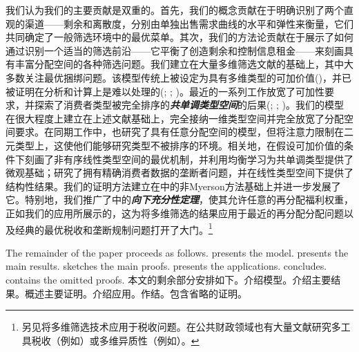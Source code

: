 \documentclass[12pt,letterpaper]{article}
\newenvironment{original}{\color{black}\noindent}{}
\newenvironment{translation}{\color{blue}\noindent}{}
\theoremstyle{plain}
\theoremstyle{definition}
\theoremstyle{remark}
\renewcommand{\1}{\mathds{1}}
\theoremstyle{definition}
\begin{document}
\begin{translation}
我们认为我们的主要贡献是双重的。首先，我们的概念贡献在于明确识别了两个直观的渠道——剩余和离散度，分别由单独出售需求曲线的水平和弹性来衡量，它们共同确定了一般筛选环境中的最优菜单。其次，我们的方法论贡献在于展示了如何通过识别一个适当的筛选前沿——它平衡了创造剩余和控制信息租金——来刻画具有丰富分配空间的各种筛选问题。我们建立在大量多维筛选文献的基础上，其中大多数关注最优捆绑问题。该模型传统上被设定为具有多维类型的可加价值(\citealt*{McAfee1989MultiproductValues,Rochet1998, mcafee1988multidimensional, manelli2006bundling, daskalakis2017strong})，并已被证明在分析和计算上是难以处理的(\citealt{Rochet2003}; \citealt{daskalakis2014complexity}; \citealt{lahr2024extreme})。最近的一系列工作放宽了可加性要求，并探索了消费者类型被完全排序的\textit{\textbf{共单调类型空间}}的后果(\citealt{haghpanah2021pure}; \citealt{ghili2021characterization}; \citealt{yang2023nested})。我们的模型在很大程度上建立在上述文献基础上，完全接纳一维类型空间并完全放宽了分配空间要求。在同期工作中，\citet{haghpanah2025screening}也研究了具有任意分配空间的模型，但将注意力限制在二元类型上，这使他们能够研究类型不被排序的环境。相关地，\cite{pernoud2025bundling}在假设可加价值的条件下刻画了非有序线性类型空间的最优机制，并利用均衡学习为共单调类型提供了微观基础；\cite*{frick2024multidimensional}研究了拥有精确消费者数据的垄断者问题，并在线性类型空间下提供了结构性结果。我们的证明方法建立在\citet{yang2022costly}中的非Myerson方法基础上并进一步发展了它。特别地，我们推广了\citet{yang2022costly}中的\textit{\textbf{向下充分性定理}}，使其允许任意的再分配福利权重，正如我们的应用所展示的，这为将多维筛选的结果应用于最近的再分配分配问题以及经典的最优税收和垄断规制问题打开了大门。\footnote{另见\citet{doligalski2025optimal}将多维筛选技术应用于税收问题。在公共财政领域也有大量文献研究多工具税收（例如\citealt*{ferey2024sufficient}）或多维异质性（例如\citealt*{golosov2025optimal}）。}
\end{translation}

\begin{original}
The remainder of the paper proceeds as follows.  presents the model.  presents the main results.  sketches the main proofs.  presents the applications.  concludes.  contains the omitted proofs.
\end{original}
\begin{translation}
本文的剩余部分安排如下。介绍模型。介绍主要结果。概述主要证明。介绍应用。作结。包含省略的证明。
\end{translation}
\end{document}
